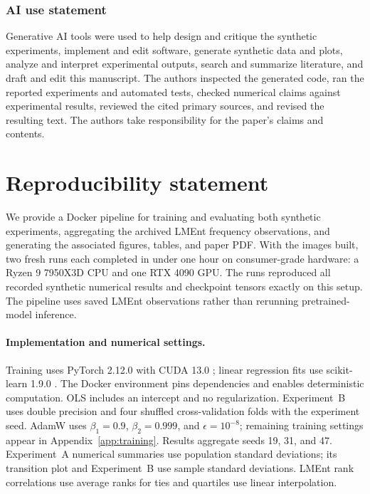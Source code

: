 \documentclass[11pt]{article}
\begin{document}
\subsubsection*{AI use statement}
Generative AI tools were used to help design and critique the synthetic
experiments, implement and edit software, generate synthetic data and plots,
analyze and interpret experimental outputs, search and summarize literature, and
draft and edit this manuscript. The authors inspected the generated code, ran the
reported experiments and automated tests, checked numerical claims against
experimental results, reviewed the cited primary sources, and revised the
resulting text. The authors take responsibility for the paper's claims and
contents.



\clearpage
\appendix

\section{Reproducibility statement}
\label{app:reproducibility}

We provide a Docker pipeline for training and evaluating both synthetic
experiments, aggregating the archived LMEnt frequency observations, and generating
the associated figures, tables, and paper PDF. With the images built, two fresh
runs each completed in under one hour on consumer-grade hardware: a Ryzen 9
7950X3D CPU and one RTX 4090 GPU. The runs reproduced all recorded synthetic
numerical results and checkpoint tensors exactly on this setup. The pipeline
uses saved LMEnt observations rather than rerunning pretrained-model inference.

\paragraph{Implementation and numerical settings.}
Training uses PyTorch 2.12.0 with CUDA 13.0 \citep{paszke2019pytorch}; linear regression
fits use scikit-learn 1.9.0 \citep{pedregosa2011scikit}. The Docker environment
pins dependencies and enables deterministic computation. OLS includes an
intercept and no regularization. Experiment~B uses double precision and four
shuffled cross-validation folds with the experiment seed. AdamW uses
$\beta_1=0.9$, $\beta_2=0.999$, and $\epsilon=10^{-8}$; remaining training
settings appear in Appendix~\ref{app:training}. Results aggregate seeds 19, 31,
and 47. Experiment~A numerical summaries use population standard deviations;
its transition plot and Experiment~B use sample standard deviations. LMEnt
rank correlations use average ranks for ties and quartiles use linear
interpolation.
\end{document}
